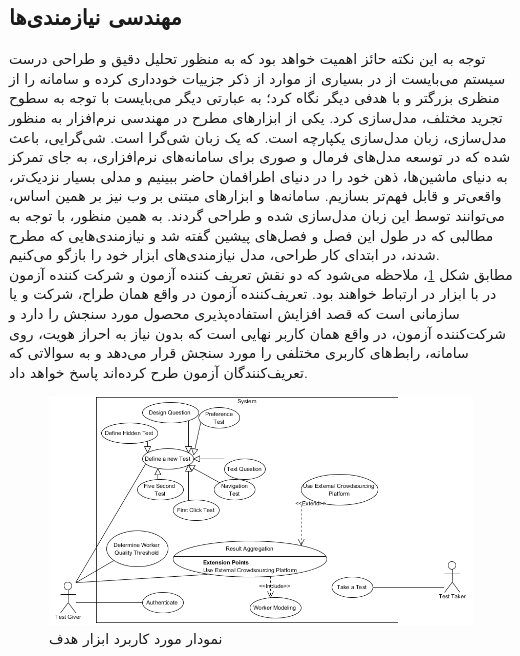 \subsection{مهندسی نیازمندی‌ها}
توجه به این نکته حائز اهمیت خواهد بود که به منظور تحلیل دقیق و طراحی درست سیستم می‌بایست از در بسیاری از موارد از ذکر جزییات خودداری کرده و سامانه را از منظری بزرگتر و با هدفی دیگر نگاه کرد؛ به عبارتی دیگر می‌بایست با توجه به سطوح تجرید مختلف، مدل‌سازی کرد. یکی از ابزارهای مطرح در مهندسی نرم‌افزار به منظور مدل‌سازی، زبان مدل‌سازی یکپارچه است. که یک زبان شی‌گرا است. شی‌گرایی، باعث شده که در توسعه مدل‌های فرمال و صوری برای سامانه‌های نرم‌افزاری، به جای تمرکز به دنیای ماشین‌ها، ذهن خود را در دنیای اطرافمان حاضر ببینیم و مدلی بسیار نزدیک‌تر، واقعی‌تر و قابل فهم‌تر بسازیم. سامانه‌ها و ابزارهای مبتنی بر وب نیز بر همین اساس، می‌توانند توسط این زبان مدل‌سازی شده و طراحی گردند. به همین منظور، با توجه به مطالبی که در طول این فصل و فصل‌های پیشین گفته شد و نیازمندی‌هایی که مطرح شدند، در ابتدای کار طراحی، مدل نیازمندی‌های ابزار خود را بازگو می‌کنیم.\\
مطابق شکل
\ref{fig:usecase}،
ملاحظه می‌شود که دو نقش تعریف کننده آزمون و شرکت کننده آزمون در با ابزار در ارتباط خواهند بود. تعریف‌کننده آزمون در واقع همان طراح، شرکت و یا سازمانی است که قصد افزایش استفاده‌پذیری محصول مورد سنجش را دارد و شرکت‌کننده آزمون، در واقع همان کاربر نهایی است که بدون نیاز به احراز هویت، روی سامانه، رابط‌های کاربری مختلفی را مورد سنجش قرار می‌دهد و به سوالاتی که تعریف‌کنندگان آزمون طرح کرده‌اند پاسخ خواهد داد.
\begin{figure}[H]
	\centering\includegraphics[width=\linewidth]{Resources/UseCaseDiagram.PNG}
	\caption[نمودار مورد کاربرد سامانه هدف]{
		نمودار مورد کاربرد
		ابزار هدف
	}
	\label{fig:usecase}
\end{figure}
